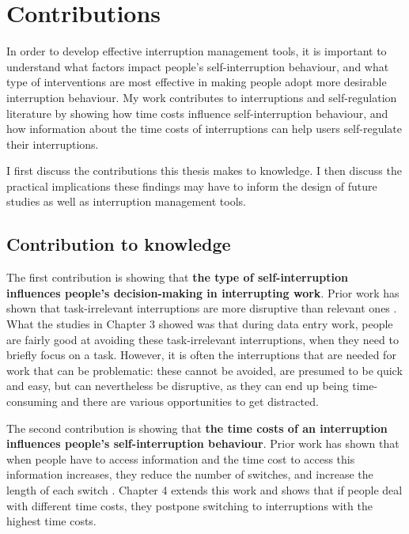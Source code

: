 \section{Contributions}
In order to develop effective interruption management tools, it is important to understand what factors impact people’s self-interruption behaviour, and what type of interventions are most effective in making people adopt more desirable interruption behaviour. My work contributes to interruptions and self-regulation literature by showing how time costs influence self-interruption behaviour, and how information about the time costs of interruptions can help users self-regulate their interruptions. 

I first discuss the contributions this thesis makes to knowledge. I then discuss the practical implications these findings may have to inform the design of future studies as well as interruption management tools. 



\subsection{Contribution to knowledge}
The first contribution is showing that \textbf{the type of self-interruption influences people’s decision-making in interrupting work}. Prior work has shown that task-irrelevant interruptions are more disruptive than relevant ones \citep{Iqbal2008}. What the studies in Chapter 3 showed was that during data entry work, people are fairly good at avoiding these task-irrelevant interruptions, when they need to briefly focus on a task. However, it is often the interruptions that are needed for work that can be problematic: these cannot be avoided, are presumed to be quick and easy,  but can nevertheless be disruptive, as they can end up being time-consuming and there are various opportunities to get distracted. 

The second contribution is showing that \textbf{the time costs of an interruption influences people’s self-interruption behaviour}. Prior work has shown that when people have to access information and the time cost to access this information increases, they reduce the number of switches, and increase the length of each switch \citep{Gray2006}. Chapter 4 extends this work and shows that if people deal with different time costs, they postpone switching to interruptions with the highest time costs. 

